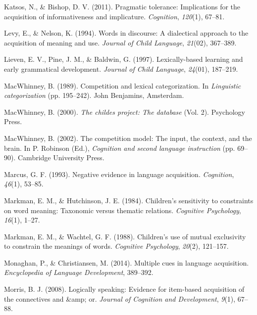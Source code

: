 \documentclass[oneside]{report}
\theoremstyle{definition}
\theoremstyle{definition}
\theoremstyle{definition}
\theoremstyle{remark}
\begin{document}
\hypertarget{ref-katsos2011pragmatic}{}
Katsos, N., \& Bishop, D. V. (2011). Pragmatic tolerance: Implications
for the acquisition of informativeness and implicature.
\emph{Cognition}, \emph{120}(1), 67--81.

\hypertarget{ref-levy1994words}{}
Levy, E., \& Nelson, K. (1994). Words in discourse: A dialectical
approach to the acquisition of meaning and use. \emph{Journal of Child
Language}, \emph{21}(02), 367--389.

\hypertarget{ref-lieven1997lexically}{}
Lieven, E. V., Pine, J. M., \& Baldwin, G. (1997). Lexically-based
learning and early grammatical development. \emph{Journal of Child
Language}, \emph{24}(01), 187--219.

\hypertarget{ref-macwhinney1989competition}{}
MacWhinney, B. (1989). Competition and lexical categorization. In
\emph{Linguistic categorization} (pp. 195--242). John Benjamins,
Amsterdam.

\hypertarget{ref-macwhinney2000childes}{}
MacWhinney, B. (2000). \emph{The childes project: The database} (Vol.
2). Psychology Press.

\hypertarget{ref-macwhinney2002competition}{}
MacWhinney, B. (2002). The competition model: The input, the context,
and the brain. In P. Robinson (Ed.), \emph{Cognition and second language
instruction} (pp. 69--90). Cambridge University Press.

\hypertarget{ref-marcus1993negative}{}
Marcus, G. F. (1993). Negative evidence in language acquisition.
\emph{Cognition}, \emph{46}(1), 53--85.

\hypertarget{ref-markman1984children}{}
Markman, E. M., \& Hutchinson, J. E. (1984). Children's sensitivity to
constraints on word meaning: Taxonomic versus thematic relations.
\emph{Cognitive Psychology}, \emph{16}(1), 1--27.

\hypertarget{ref-markman1988children}{}
Markman, E. M., \& Wachtel, G. F. (1988). Children's use of mutual
exclusivity to constrain the meanings of words. \emph{Cognitive
Psychology}, \emph{20}(2), 121--157.

\hypertarget{ref-monaghan2014multiple}{}
Monaghan, P., \& Christiansen, M. (2014). Multiple cues in language
acquisition. \emph{Encyclopedia of Language Development}, 389--392.

\hypertarget{ref-morris2008logically}{}
Morris, B. J. (2008). Logically speaking: Evidence for item-based
acquisition of the connectives and \&amp; or. \emph{Journal of Cognition
and Development}, \emph{9}(1), 67--88.
\end{document}
